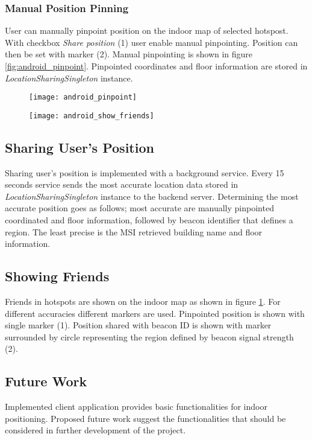 \subsubsection{Manual Position Pinning}
User can manually pinpoint position on the indoor map of selected hotspost. With checkbox \textit{Share position} (1) user enable manual pinpointing. Position can then be set with marker (2). Manual pinpointing is shown in figure \ref{fig:android_pinpoint}. Pinpointed coordinates and floor information are stored in \textit{LocationSharingSingleton} instance.

\begin{figure}
\centering
\begin{minipage}{.5\textwidth}
  \centering
  \texttt{[image: android\_pinpoint]}
  \label{fig:android_pinpoint}
\end{minipage}%
\begin{minipage}{.5\textwidth}
  \centering
  \texttt{[image: android\_show\_friends]}
  \label{fig:android_show_friends}
\end{minipage}
\end{figure}

\subsection{Sharing User's Position}
Sharing user's position is implemented with a background service. Every 15 seconds service sends the most accurate location data stored in \textit{LocationSharingSingleton} instance to the backend server. Determining the most accurate position goes as follows; most accurate are manually pinpointed coordinated and floor information, followed by beacon identifier that defines a region. The least precise is the MSI retrieved building name and floor information.

\subsection{Showing Friends}
Friends in hotspots are shown on the indoor map as shown in figure \ref{fig:android_show_friends}. For different accuracies different markers are used. Pinpointed position is shown with single marker (1). Position shared with beacon ID is shown with marker surrounded by circle representing the region defined by beacon signal strength (2).

\subsection{Future Work}
Implemented client application provides basic functionalities for indoor positioning. Proposed future work suggest the functionalities that should be considered in further development of the project.

